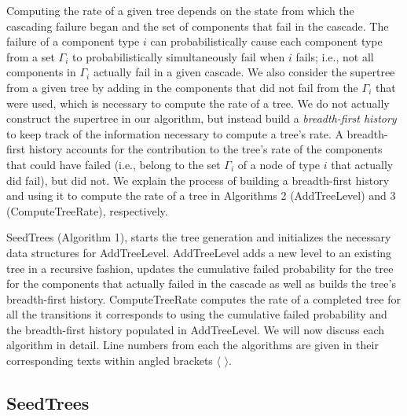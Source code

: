 \documentclass[12pt]{article}
\newcommand{\varName}[1]{\textrm{\it#1}}
\newcommand{\citeLine}[1]{$\langle\,#1\,\rangle$}
\begin{document}
Computing the rate of a given tree depends on the state from which the cascading failure began and the set of components that fail in the cascade. The failure of a component type $i$ can probabilistically cause each component type from a set $\Gamma_i$ to probabilistically simultaneously fail when $i$ fails; i.e., not all components in $\Gamma_i$ actually fail in a given cascade. We also consider the supertree from a given tree by adding in the components that did not fail from the $\Gamma_i$ that were used, which is necessary to compute the rate of a tree. We do not actually construct the supertree in our algorithm, but instead build a \varName{breadth-first history} to keep track of the information necessary to compute a tree's rate. A breadth-first history accounts for the contribution to the tree's rate of the components that could have failed (i.e., belong to the set $\Gamma_i$ of a node of type $i$ that actually did fail), but did not. We explain the process of building a breadth-first history and using it to compute the rate of a tree in Algorithms 2 (AddTreeLevel) and 3 (ComputeTreeRate), respectively.

SeedTrees (Algorithm 1), starts the tree generation and initializes the necessary data structures for AddTreeLevel. AddTreeLevel adds a new level to an existing tree in a recursive fashion, updates the cumulative failed probability for the tree for the components that actually failed in the cascade as well as builds the tree's breadth-first history. ComputeTreeRate computes the rate of a completed tree for all the transitions it corresponds to using the cumulative failed probability and the breadth-first history populated in AddTreeLevel. We will now discuss each algorithm in detail. Line numbers from each the algorithms are given in their corresponding texts within angled brackets \citeLine{}.

\subsection{SeedTrees}
\end{document}
